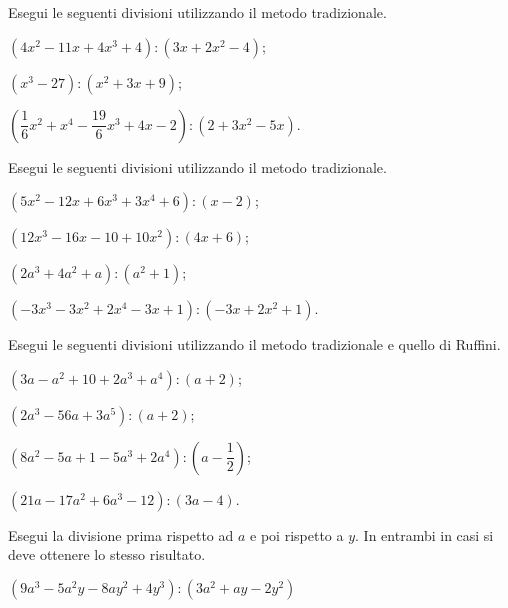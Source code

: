 \begin{esercizio}[\Ast]
\label{ese:11.61}
Esegui le seguenti divisioni utilizzando il metodo tradizionale.
 \begin{enumeratea}
 \item $\left(4x^{2}-11x+4x^{3}+4\right):\left(3x+2x^{2}-4\right)$;
 \item $\left(x^{3}-27\right):\left(x^{2}+3x+9\right)$;
 \item $\left(\dfrac{1}{6}x^{2}+x^{4}-\dfrac{19}{6}x^{3}+4x-2\right):\left(2+3x^{2}-5x\right)$.
 \end{enumeratea}
\end{esercizio}

\begin{esercizio}[\Ast]
\label{ese:11.62}
Esegui le seguenti divisioni utilizzando il metodo tradizionale.
 \begin{enumeratea}
 \item $\left(5x^{2}-12x+6x^{3}+3x^{4}+6\right):(x-2)$;
 \item $\left(12x^{3}-16x-10+10x^{2}\right):(4x+6)$;
 \item $\left(2a^{3}+4a^{2}+a\right):\left(a^{2}+1\right)$;
 \item $\left(-3x^{3}-3x^{2}+2x^{4}-3x+1\right):\left(-3x+2x^{2}+1\right)$.
 \end{enumeratea}
\end{esercizio}

\begin{esercizio}[\Ast]
\label{ese:11.63}
Esegui le seguenti divisioni utilizzando il metodo tradizionale e quello di Ruffini.
 \begin{enumeratea}
 \item $\left(3a-a^{2}+10+2a^{3}+a^{4}\right):(a+2)$;
 \item $\left(2a^{3}-56a+3a^{5}\right):(a+2)$;
 \item $\left(8a^{2}-5a+1-5a^{3}+2a^{4}\right):\left(a-\dfrac{1}{2}\right)$;
 \item $\left(21a-17a^{2}+6a^{3}-12\right):(3a-4)$.
 \end{enumeratea}
\end{esercizio}

\begin{esercizio}[\Ast]
\label{ese:11.64}
Esegui la divisione prima rispetto ad $a$ e poi rispetto a $y$. In entrambi in casi si deve ottenere lo stesso risultato.

$\left(9a^{3}-5a^{2}y-8ay^{2}+4y^{3}\right):\left(3a^{2}+ay-2y^{2}\right)$
\end{esercizio}

